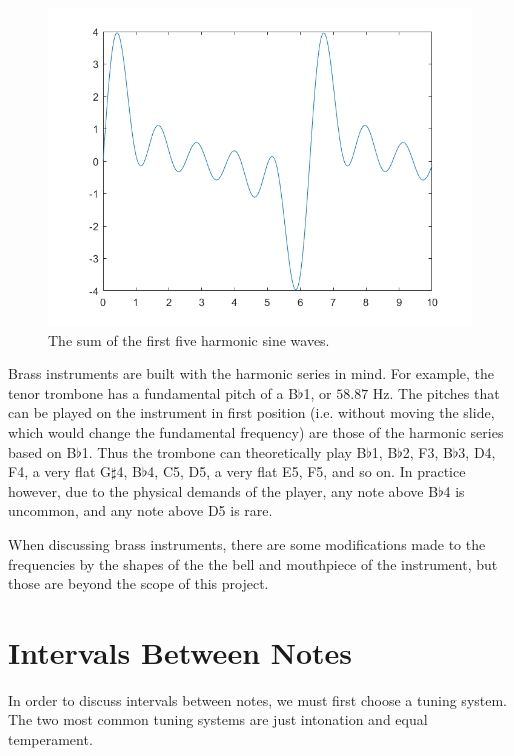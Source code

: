 \begin{figure}
	\centering
	\includegraphics[width=\textwidth]{../figures/summedSinWaves.png}
	\caption{The sum of the first five harmonic sine waves.}
	\label{fig:summedHarmonics}
\end{figure}

Brass instruments are built with the harmonic series in mind.
For example, the tenor trombone has a fundamental pitch of a B$\flat$1, or $58.87$ Hz.
The pitches that can be played on the instrument in first position (i.e. without moving the slide, which would change the fundamental frequency) are those of the harmonic series based on B$\flat$1.
Thus the trombone can theoretically play B$\flat$1, B$\flat$2, F3, B$\flat$3, D4, F4, a very flat G$\sharp$4, B$\flat$4, C5, D5, a very flat E5, F5, and so on.
In practice however, due to the physical demands of the player, any note above B$\flat$4 is uncommon, and any note above D5 is rare.

When discussing brass instruments, there are some modifications made to the frequencies by the shapes of the the bell and mouthpiece of the instrument, but those are beyond the scope of this project.


\section{Intervals Between Notes} \label{mathinmusic:intervals}

In order to discuss intervals between notes, we must first choose a tuning system.
The two most common tuning systems are just intonation and equal temperament.


